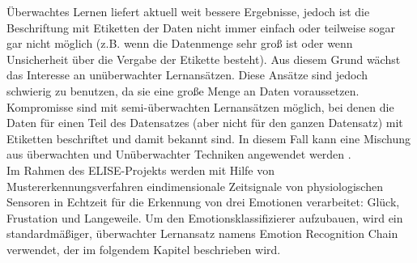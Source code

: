 Überwachtes Lernen liefert aktuell weit bessere Ergebnisse, jedoch ist die Beschriftung mit Etiketten der Daten nicht immer einfach oder teilweise sogar gar nicht möglich (z.B. wenn die Datenmenge sehr groß ist oder wenn Unsicherheit über die Vergabe der Etikette besteht).
Aus diesem Grund wächst das Interesse an unüberwachter Lernansätzen.
Diese Ansätze sind jedoch schwierig zu benutzen, da sie eine große Menge an Daten voraussetzen.
Kompromisse sind mit semi-überwachten Lernansätzen möglich, bei denen die Daten für einen Teil des Datensatzes (aber nicht für den ganzen Datensatz) mit Etiketten beschriftet und damit bekannt sind.
In diesem Fall kann eine Mischung aus überwachten und Unüberwachter Techniken angewendet werden \cite{Zhu2008}. \\


Im Rahmen des ELISE-Projekts werden mit Hilfe von Mustererkennungsverfahren eindimensionale Zeitsignale von physiologischen Sensoren in Echtzeit für die Erkennung von drei Emotionen verarbeitet: Glück, Frustation und Langeweile. Um den Emotionsklassifizierer aufzubauen, wird ein standardmäßiger, überwachter Lernansatz namens Emotion Recognition Chain verwendet, der im folgendem Kapitel beschrieben wird. \\
